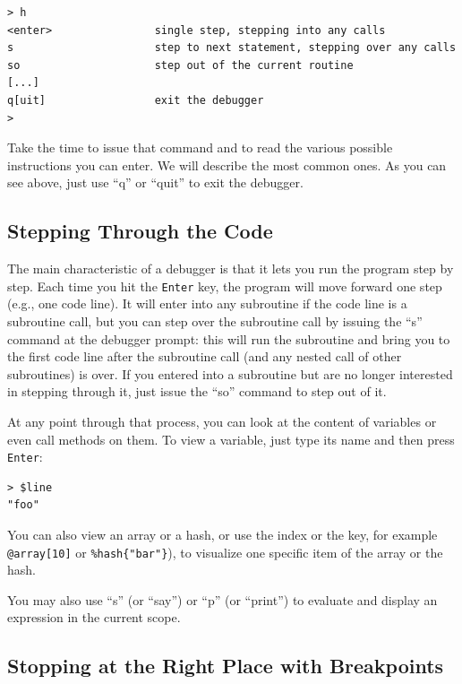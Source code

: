 \begin{verbatim}
> h
<enter>                single step, stepping into any calls
s                      step to next statement, stepping over any calls
so                     step out of the current routine
[...]
q[uit]                 exit the debugger
>
\end{verbatim}

Take the time to issue that command and to read the 
various possible instructions you can enter. We will 
describe the most common ones. As you can see 
above, just use ``q'' or ``quit'' to exit the debugger.

\subsection{Stepping Through the Code}


The main characteristic of a debugger is that it 
lets you run the program step 
by step. Each time you hit the {\tt Enter} key, the 
program will move forward one step (e.g., one code line). 
It will enter into any subroutine if the code line 
is a subroutine call, but you can step over the 
subroutine call by issuing the ``s'' 
command at the debugger prompt: this will run the subroutine 
and bring you to the first code line after the subroutine 
call (and any nested call of other subroutines) is over.
If you entered into a subroutine but are no longer 
interested in stepping through it, just issue the ``so'' 
command to step out of it.

At any point through that process, you can look at the 
content of variables or even call methods on them. To 
view a variable, just type its name and then press 
{\tt Enter}:

\begin{verbatim}
> $line
"foo"
\end{verbatim}

You can also view an array or a hash, or use the index 
or the key, for example \verb'@array[10]' or 
\verb'%hash{"bar"}'), to visualize one specific item of 
the array or the hash.

You may also use ``s'' (or ``say'') or ``p'' (or ``print'') 
to evaluate and display an expression in the current scope.

\subsection{Stopping at the Right Place with Breakpoints}

